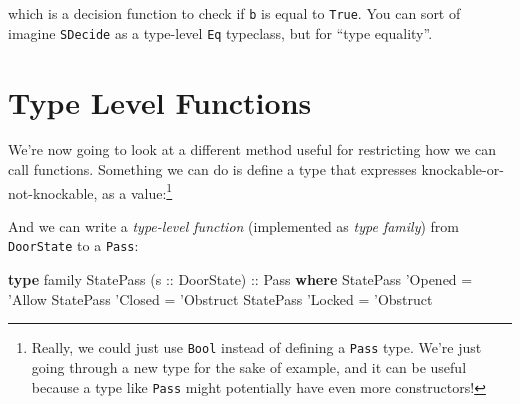 \documentclass[]{article}
\newenvironment{Shaded}{}{}
\newcommand{\DataTypeTok}[1]{\textcolor[rgb]{0.56,0.13,0.00}{#1}}
\newcommand{\FunctionTok}[1]{\textcolor[rgb]{0.02,0.16,0.49}{#1}}
\newcommand{\KeywordTok}[1]{\textcolor[rgb]{0.00,0.44,0.13}{\textbf{#1}}}
\newcommand{\NormalTok}[1]{#1}
\newcommand{\OtherTok}[1]{\textcolor[rgb]{0.00,0.44,0.13}{#1}}
\begin{document}
\begin{Shaded}
\end{Shaded}

which is a decision function to check if \texttt{b} is equal to
\texttt{\textquotesingle{}True}. You can sort of imagine \texttt{SDecide} as a
type-level \texttt{Eq} typeclass, but for ``type equality''.

\hypertarget{type-level-functions}{%
\section{Type Level Functions}\label{type-level-functions}}

We're now going to look at a different method useful for restricting how we can
call functions. Something we can do is define a type that expresses
knockable-or-not-knockable, as a value:\footnote{Really, we could just use
  \texttt{Bool} instead of defining a \texttt{Pass} type. We're just going
  through a new type for the sake of example, and it can be useful because a
  type like \texttt{Pass} might potentially have even more constructors!}

\begin{Shaded}
\end{Shaded}

And we can write a \emph{type-level function} (implemented as \emph{type
family}) from \texttt{DoorState} to a \texttt{Pass}:

\begin{Shaded}
\begin{Highlighting}[]
\KeywordTok{type}\NormalTok{ family }\DataTypeTok{StatePass}\NormalTok{ (}\OtherTok{s ::} \DataTypeTok{DoorState}\NormalTok{)}\OtherTok{ ::} \DataTypeTok{Pass} \KeywordTok{where}
    \DataTypeTok{StatePass}\NormalTok{ '}\DataTypeTok{Opened} \FunctionTok{=}\NormalTok{ '}\DataTypeTok{Allow}
    \DataTypeTok{StatePass}\NormalTok{ '}\DataTypeTok{Closed} \FunctionTok{=}\NormalTok{ '}\DataTypeTok{Obstruct}
    \DataTypeTok{StatePass}\NormalTok{ '}\DataTypeTok{Locked} \FunctionTok{=}\NormalTok{ '}\DataTypeTok{Obstruct}
\end{Highlighting}
\end{Shaded}
\end{document}
